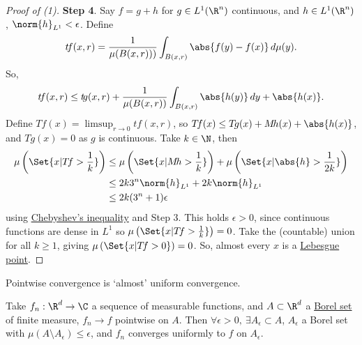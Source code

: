 \documentclass{article}
\begin{document}
\begin{proof}[Proof of (1)]
    \textbf{Step 4}.
    Say $f = g+h$ for $g \in L^1(\R^n)$ continuous, and $h \in L^1(\R^n)$, $\norm{h}_{L^1} < \epsilon$.
    Define
    \begin{equation*}
        t\!f(x, r) = \frac{1}{\mu(B(x, r)))} \int_{B(x, r)} \abs{f(y) - f(x)} \, d \mu(y).
    \end{equation*}
    So,
    \begin{equation*}
        t\!f(x, r) \leq t \! g(x, r) + \frac{1}{\mu(B(x, r))} \int_{B(x, r)} \abs{h(y)} \, dy + \abs{h(x)}.
    \end{equation*}
    Define $T \! f (x) = \limsup_{r \to 0} t \! f(x, r)$, so $T\! f(x) \leq T \! g(x) + M \! h(x) + \abs{h(x)}$, and $T\!g(x)  = 0$ as $g$ is continuous.
    Take $k \in \N$, then
    \begin{align*}
        \mu\left(\Set{x | T \! f > \frac{1}{k}}\right) &\leq \mu\left(\Set{x | M \! h > \frac{1}{k}}\right) + \mu\left(\Set{x | \abs{h} > \frac{1}{2k}}\right) \\
                                            &\leq 2k 3^n \norm{h}_{L^1} + 2k \norm{h}_{L^1} \\
                                            &\leq 2k (3^n+1) \epsilon
    \end{align*}
    using \hyperlink{def:chebyshev}{Chebyshev's inequality} and Step 3.
    This holds $\epsilon > 0$, since continuous functions are dense in $L^1$ so $\mu\left(\Set{x | T \! f > \frac{1}{k}}\right) = 0$.
    Take the (countable) union for all $k\geq 1$, giving $\mu\left(\Set{x | T\! f > 0}\right) = 0$.
    So, almost every $x$ is a \hyperlink{def:lebPoint}{Lebesgue point}.
\end{proof}
Pointwise convergence is `almost' uniform convergence.
\begin{thm}\label{thm:egorov}
    Take $f_n: \R^d \to \C$ a sequence of measurable functions, and $A \subset \R^d$ a \hyperlink{def:borelSet}{Borel set} of finite measure, $f_n \to f$ pointwise on $A$.
    Then $\forall \epsilon > 0, \ \exists A_\epsilon \subset A$, $A_\epsilon$ a Borel set with $\mu(A \setminus A_\epsilon) \leq \epsilon$, and $f_n$ converges uniformly to $f$ on $A_\epsilon$.
\end{thm}
\end{document}
